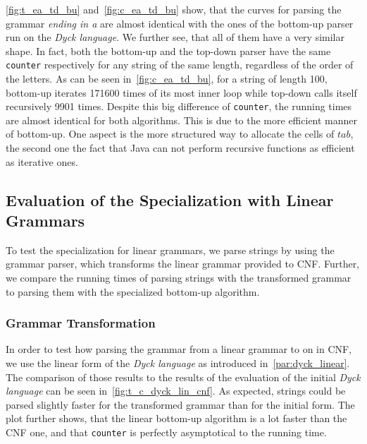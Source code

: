 \cref{fig:t_ea_td_bu} and~\cref{fig:c_ea_td_bu} show, that the curves for parsing the grammar \textit{ending in a} are almost identical with the ones of the bottom-up parser run on the \textit{Dyck language}.
We further see, that all of them have a very similar shape.
In fact, both the bottom-up and the top-down parser have the same \texttt{counter} respectively for any string of the same length, regardless of the order of the letters.
As can be seen in~\cref{fig:c_ea_td_bu}, for a string of length 100, bottom-up iterates 171600 times of its most inner loop while top-down calls itself recursively 9901 times.
Despite this big difference of \texttt{counter}, the running times are almost identical for both algorithms.
This is due to the more efficient manner of bottom-up.
One aspect is the more structured way to allocate the cells of $tab$, the second one the fact that Java can not perform recursive functions as efficient as iterative ones.


\subsection{Evaluation of the Specialization with Linear Grammars}
To test the specialization for linear grammars, we parse strings by using the grammar parser, which transforms the linear grammar provided to CNF.
Further, we compare the running times of parsing strings with the transformed grammar to parsing them with the specialized bottom-up algorithm.

\subsubsection{Grammar Transformation}
In order to test how parsing the grammar from a linear grammar to on in CNF, we use the linear form of the \textit{Dyck language} as introduced in~\cref{par:dyck_linear}.
The comparison of those results to the results of the evaluation of the initial \textit{Dyck language} can be seen in~\cref{fig:t_c_dyck_lin_cnf}.
As expected, strings could be parsed slightly faster for the transformed grammar than for the initial form.
The plot further shows, that the linear bottom-up algorithm is a lot faster than the CNF one, and that \texttt{counter} is perfectly asymptotical to the running time.

